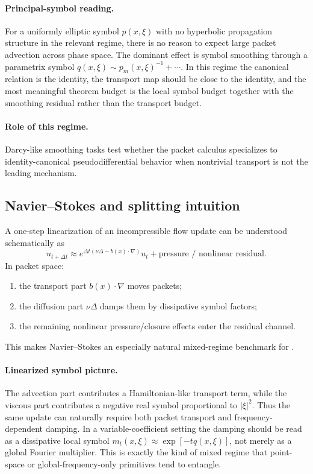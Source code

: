 \paragraph{Principal-symbol reading.}
For a uniformly elliptic symbol $p(x,\xi)$ with no hyperbolic propagation structure in the relevant regime, there is no reason to expect large packet advection across phase space. The dominant effect is symbol smoothing through a parametrix symbol $q(x,\xi)\sim p_m(x,\xi)^{-1}+\cdots$. In this regime the canonical relation is the identity, the transport map should be close to the identity, and the most meaningful theorem budget is the local symbol budget together with the smoothing residual rather than the transport budget.

\paragraph{Role of this regime.}
Darcy-like smoothing tasks test whether the packet calculus specializes to identity-canonical pseudodifferential behavior when nontrivial transport is not the leading mechanism.

\subsection{Navier--Stokes and splitting intuition}

A one-step linearization of an incompressible flow update can be understood schematically as
\[
u_{t+\Delta t}
\approx
e^{\Delta t(\nu \Delta - b(x)\cdot\nabla)}u_t
 + \text{pressure / nonlinear residual}.
\]
In packet space:
\begin{enumerate}
\item the transport part $b(x)\cdot\nabla$ moves packets;
\item the diffusion part $\nu\Delta$ damps them by dissipative symbol factors;
\item the remaining nonlinear pressure/closure effects enter the residual channel.
\end{enumerate}
This makes Navier--Stokes an especially natural mixed-regime benchmark for \MiNO.

\paragraph{Linearized symbol picture.}
The advection part contributes a Hamiltonian-like transport term, while the viscous part contributes a negative real symbol proportional to $|\xi|^2$. Thus the same update can naturally require both packet transport and frequency-dependent damping. In a variable-coefficient setting the damping should be read as a dissipative local symbol $m_t(x,\xi)\approx\exp[-tq(x,\xi)]$, not merely as a global Fourier multiplier. This is exactly the kind of mixed regime that point-space or global-frequency-only primitives tend to entangle.

